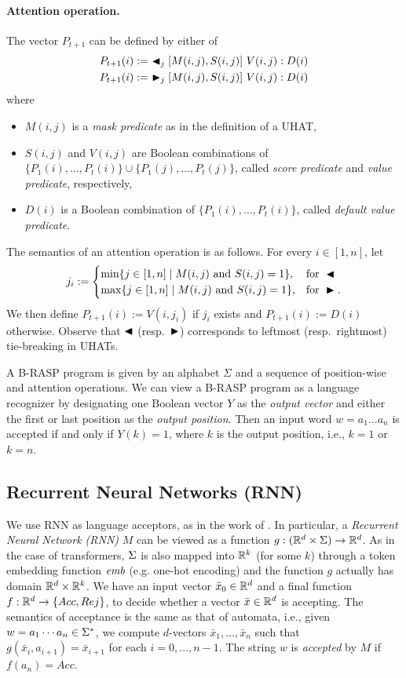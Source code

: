 \paragraph{Attention operation.} 
The vector $P_{t+1}$ can be defined by either of
\begin{gather*}
P_{t+1}(i) :=\ \blacktriangleleft_j [M(i,j), S(i,j)]\ V(i,j) : D(i)\\
P_{t+1}(i) :=\ \blacktriangleright_j [M(i,j), S(i,j)]\ V(i,j) : D(i)
\end{gather*}
where
\begin{itemize}
\item $M(i,j)$ is a \emph{mask predicate} as in the definition of a UHAT,
\item $S(i,j)$ and $V(i,j)$ are Boolean combinations of $\{P_1(i),\dots,P_t(i)\} \cup \{P_1(j),\dots,P_t(j)\}$, 
called \emph{score predicate} and \emph{value predicate}, respectively,
\item $D(i)$ is a Boolean combination of $\{P_1(i),\dots,P_t(i)\}$, called \emph{default value predicate}.
\end{itemize}
The semantics of an attention operation is as follows.
For every $i \in [1,n]$, let 
\[j_i := \begin{cases}
\min\{j \in [1,n] \mid M(i,j) \text{ and } S(i,j) = 1\}, &\text{for } \blacktriangleleft\\
\max\{j \in [1,n] \mid M(i,j) \text{ and } S(i,j) = 1\}, &\text{for } \blacktriangleright.
\end{cases}\]
We then define $P_{t+1}(i) := V(i,j_i)$ if $j_i$ exists and $P_{t+1}(i) := D(i)$ otherwise.
Observe that $\blacktriangleleft$ (resp.\ $\blacktriangleright$) corresponds to leftmost (resp.\ rightmost) tie-breaking in UHATs.

A B-RASP program is given by an alphabet $\Sigma$ and a sequence of position-wise and attention operations.
We can view a B-RASP program as a language recognizer by designating one Boolean vector $Y$ as the \emph{output vector}
and either the first or last position as the \emph{output position}.
Then an input word $w = a_1 \dots a_n$ is accepted if and only if $Y(k) = 1$,
where $k$ is the output position, i.e., $k=1$ or $k=n$.

\subsection{Recurrent Neural Networks (RNN)} We use RNN as language acceptors,
as in the work of \cite{RNN-hierarchy,WGY24,WGY18}. In particular,
a \emph{Recurrent Neural Network (RNN)} $M$ can be viewed as a function 
$g: (\mathbb{R}^d \times \Sigma) \to \mathbb{R}^d$. As in the case of transformers,
$\Sigma$ is also mapped into $\mathbb{R}^k$ (for some $k$) through a token embedding
function $\mathit{emb}$ (e.g. one-hot encoding) and the function $g$ actually has domain
$\mathbb{R}^d \times \mathbb{R}^k$. We have an input vector $\bar x_0 \in \mathbb{R}^d$ and a final 
function $f: \mathbb{R}^d \to \{Acc,Rej\}$, to decide whether a vector $\bar x \in \mathbb{R}^d$
is accepting. The semantics of acceptance is the same as that of automata, i.e.,
given $w = a_1\cdots a_n \in \Sigma^*$, we compute $d$-vectors 
$\bar x_1, \ldots, \bar x_n$ such that $g(\bar x_i,a_{i+1}) = \bar x_{i+1}$
for each $i = 0,\ldots,n-1$. The string $w$ is \emph{accepted} by $M$ if $f(a_n)
= Acc$. 

